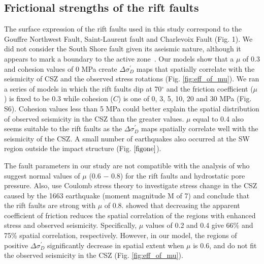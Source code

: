 \documentclass[draft]{agujournal2018}
\begin{document}
\subsection{Frictional strengths of the rift faults}
The surface expression of the rift faults used in this study correspond to the Gouffre Northwest Fault, Saint-Laurent fault and Charlevoix Fault (Fig. 1). We did not consider the South Shore fault given its aseismic nature, although it appears to mark a boundary to the active zone~\citep{lamontagne1999}. Our models show that a $\mu$ of 0.3 and cohesion values of 0 MPa create $\Delta\sigma_{D}^\prime$ maps that spatially correlate with the seismicity of CSZ and the observed stress rotations (Fig. \ref{fig:eff_of_mu}). We ran a series of models in which the rift faults dip at 70$^{\circ}$ and the friction coefficient ($\mu$) is fixed to be 0.3 while cohesion ($C$) is one of 0, 3, 5, 10, 20 and 30 MPa (Fig. S6). Cohesion values less than 5 MPa could better explain the spatial distribution of observed seismicity in the CSZ than the greater values. $\mu$ equal to 0.4 also seems suitable to the rift faults as the $\Delta\sigma_{D}^\prime$ maps spatially correlate well with the seismicity of the CSZ. A small number of earthquakes also occurred at the SW region outside the impact structure (Fig. $\ref{figone}$).

The fault parameters in our study are not compatible with the analysis of \citet{Hurd_Zoback_2012,Hurd_Zoback2012b} who suggest normal values of $\mu$ (0.6 $-$ 0.8) for the rift faults and hydrostatic pore pressure. Also, \citet{Fereidoni2014} use Coulomb stress theory to investigate stress change in the CSZ caused by the 1663 earthquake (moment magnitude M of 7) and conclude that the rift faults are strong with $\mu$ of 0.8. \citet{Fereidoni2014} showed that decreasing the apparent coefficient of friction reduces the spatial correlation of the regions with enhanced stress and observed seismicity. Specifically, $\mu$ values of 0.2 and 0.4 give 66$\%$ and 75$\%$ spatial correlation, respectively. However, in our model, the regions of positive $\Delta\sigma_{D}^\prime$ significantly decrease in spatial extent when $\mu$ is 0.6, and do not fit the observed seismicity in the CSZ (Fig. \ref{fig:eff_of_mu}).
\end{document}
